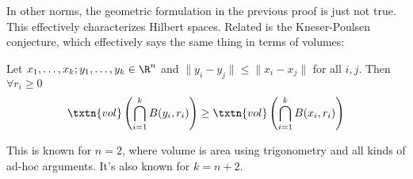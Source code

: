 \begin{rem}
In other norms, the geometric formulation in the previous proof is just not true. This effectively characterizes Hilbert spaces.
Related is the Kneser-Poulsen conjecture, which effectively says the same thing in terms of volumes:
\begin{conj}
Let $x_1, \ldots, x_k; y_1, \ldots, y_k \in \R^n$ and $\|y_i - y_j\| \leq \|x_i - x_j\|$ for all $i, j$. Then $\forall r_i \geq 0$
\[
\txtn{vol}\left(\bigcap_{i = 1}^k B(y_i, r_i) \right) \geq \txtn{vol}\left(\bigcap_{i = 1}^k B(x_i, r_i)\right)
\]
\end{conj}
This is known for $n = 2$, where volume is area using trigonometry and all kinds of ad-hoc arguments. It's also known for $k = n+2$. 
\end{rem}





